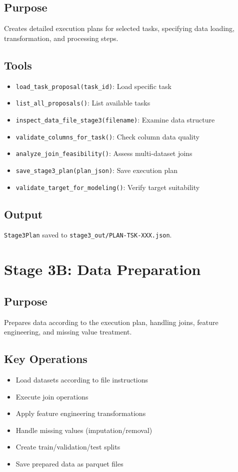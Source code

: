 \documentclass[12pt,a4paper]{report}
\begin{document}
\subsection{Purpose}
Creates detailed execution plans for selected tasks, specifying data loading, transformation, and processing steps.

\subsection{Tools}
\begin{itemize}
    \item \texttt{load\_task\_proposal(task\_id)}: Load specific task
    \item \texttt{list\_all\_proposals()}: List available tasks
    \item \texttt{inspect\_data\_file\_stage3(filename)}: Examine data structure
    \item \texttt{validate\_columns\_for\_task()}: Check column data quality
    \item \texttt{analyze\_join\_feasibility()}: Assess multi-dataset joins
    \item \texttt{save\_stage3\_plan(plan\_json)}: Save execution plan
    \item \texttt{validate\_target\_for\_modeling()}: Verify target suitability
\end{itemize}

\subsection{Output}
\texttt{Stage3Plan} saved to \texttt{stage3\_out/PLAN-TSK-XXX.json}.

\section{Stage 3B: Data Preparation}
\subsection{Purpose}
Prepares data according to the execution plan, handling joins, feature engineering, and missing value treatment.

\subsection{Key Operations}
\begin{itemize}
    \item Load datasets according to file instructions
    \item Execute join operations
    \item Apply feature engineering transformations
    \item Handle missing values (imputation/removal)
    \item Create train/validation/test splits
    \item Save prepared data as parquet files
\end{itemize}
\end{document}

